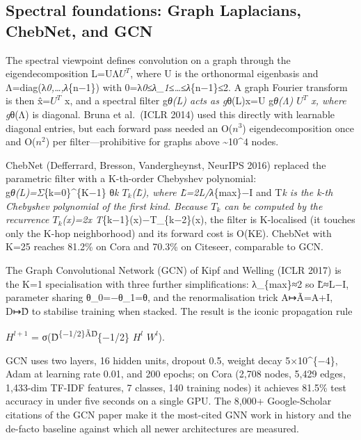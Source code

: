 \subsection{Spectral foundations: Graph Laplacians, ChebNet, and GCN}\label{spectral-foundations-graph-laplacians-chebnet-and-gcn}

The spectral viewpoint defines convolution on a graph through the eigendecomposition L=UΛ\(U^T\), where U is the orthonormal eigenbasis and Λ=diag(λ\emph{0,\ldots,λ}\{n−1\}) with 0=λ\emph{0≤λ\_1≤\ldots≤λ}\{n−1\}≤2. A graph Fourier transform is then x̂=\(U^T\) x, and a spectral filter g\emph{θ(L) acts as g}θ(L)x=U g\emph{θ(Λ) \(U^T\) x, where g}θ(Λ) is diagonal. Bruna et al.~(ICLR 2014) used this directly with learnable diagonal entries, but each forward pass needed an O(\(n^3\)) eigendecomposition once and O(\(n^2\)) per filter---prohibitive for graphs above \textasciitilde10\^{}4 nodes.

ChebNet (Defferrard, Bresson, Vandergheynst, NeurIPS 2016) replaced the parametric filter with a K-th-order Chebyshev polynomial: g\emph{θ(L)=Σ}\{k=0\}\^{}\{K−1\} θ\emph{k \(T_k\)(L̃), where L̃=2L/λ}\{max\}−I and T\emph{k is the k-th Chebyshev polynomial of the first kind. Because \(T_k\) can be computed by the recurrence \(T_k\)(x)=2x T}\{k−1\}(x)−T\_\{k−2\}(x), the filter is K-localised (it touches only the K-hop neighborhood) and its forward cost is O(K\textbar E\textbar). ChebNet with K=25 reaches 81.2\% on Cora and 70.3\% on Citeseer, comparable to GCN.

The Graph Convolutional Network (GCN) of Kipf and Welling (ICLR 2017) is the K=1 specialisation with three further simplifications: λ\_\{max\}≈2 so L̃≈L−I, parameter sharing θ\_0=−θ\_1=θ, and the renormalisation trick A↦Ã=A+I, D↦D̃ to stabilise training when stacked. The result is the iconic propagation rule

\(H^{l+1}\) = σ(D̃\textsuperscript{\{−1/2\}ÃD̃}\{−1/2\} \(H^l\) \(W^l\)).

GCN uses two layers, 16 hidden units, dropout 0.5, weight decay 5×10\^{}\{−4\}, Adam at learning rate 0.01, and 200 epochs; on Cora (2,708 nodes, 5,429 edges, 1,433-dim TF-IDF features, 7 classes, 140 training nodes) it achieves 81.5\% test accuracy in under five seconds on a single GPU. The 8,000+ Google-Scholar citations of the GCN paper make it the most-cited GNN work in history and the de-facto baseline against which all newer architectures are measured.


